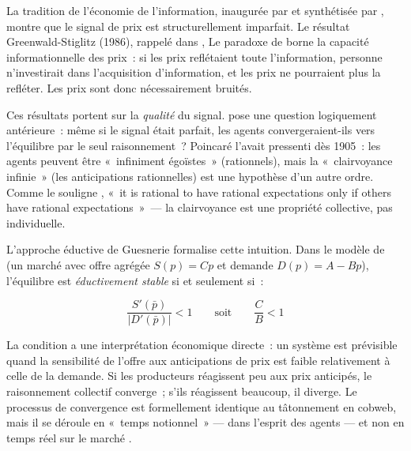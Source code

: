 La tradition de l'économie de l'information, inaugurée par \textcite{akerlof_lemons_1970} et synthétisée par \textcite{stiglitz_contributions_2000}, montre que le signal de prix est structurellement imparfait. Le résultat Greenwald-Stiglitz (1986), rappelé dans \textcite{stiglitz_contributions_2000},  Le paradoxe de \textcite{grossman_stiglitz_1980} borne la capacité informationnelle des prix~: si les prix reflétaient toute l'information, personne n'investirait dans l'acquisition d'information, et les prix ne pourraient plus la refléter. Les prix sont donc nécessairement bruités.

Ces résultats portent sur la \emph{qualité} du signal. \textcite{guesnerie_eductive_1992} pose une question logiquement antérieure~: même si le signal était parfait, les agents convergeraient-ils vers l'équilibre par le seul raisonnement~? Poincaré l'avait pressenti dès 1905~: les agents peuvent être «~infiniment égoïstes~» (rationnels), mais la «~clairvoyance infinie~» (les anticipations rationnelles) est une hypothèse d'un autre ordre. Comme le souligne \textcite{guesnerie_understanding_2021}, «~it is rational to have rational expectations only if others have rational expectations~»~--- la clairvoyance est une propriété collective, pas individuelle.

L'approche éductive de Guesnerie formalise cette intuition. Dans le modèle de \textcite{muth_rational_1961} (un marché avec offre agrégée $S(p) = Cp$ et demande $D(p) = A - Bp$), l'équilibre est \emph{éductivement stable} si et seulement si~:

\begin{equation}\label{eq:eductive}
  \frac{S'(\bar{p})}{|D'(\bar{p})|} < 1
  \qquad \text{soit} \qquad \frac{C}{B} < 1
\end{equation}

La condition a une interprétation économique directe~: un système est prévisible quand la sensibilité de l'offre aux anticipations de prix est faible relativement à celle de la demande. Si les producteurs réagissent peu aux prix anticipés, le raisonnement collectif converge~; s'ils réagissent beaucoup, il diverge. Le processus de convergence est formellement identique au tâtonnement en cobweb, mais il se déroule en «~temps notionnel~» --- dans l'esprit des agents --- et non en temps réel sur le marché \parencite{guesnerie_eductive_1992}.

